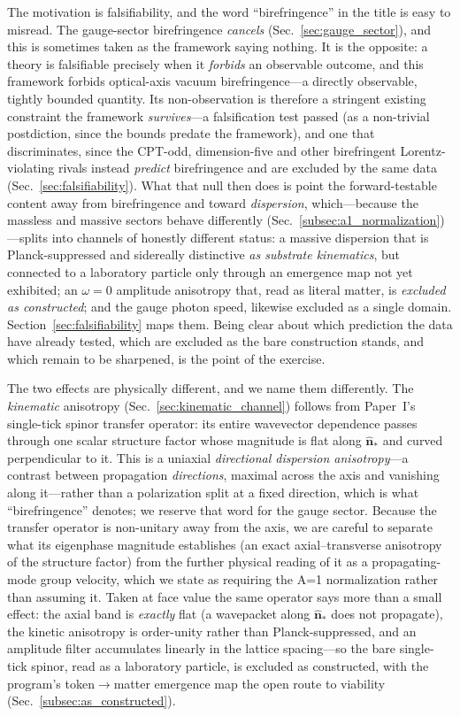 The motivation is falsifiability, and the word ``birefringence'' in the title is
easy to misread. The gauge-sector birefringence \emph{cancels}
(Sec.~\ref{sec:gauge_sector}), and this is sometimes taken as the framework saying
nothing. It is the opposite: a theory is falsifiable precisely when it \emph{forbids}
an observable outcome, and this framework forbids optical-axis vacuum birefringence---a
directly observable, tightly bounded quantity. Its non-observation is therefore a
stringent existing constraint the framework \emph{survives}---a falsification test
passed (as a non-trivial postdiction, since the bounds predate the framework), and one
that discriminates, since the CPT-odd, dimension-five and other birefringent
Lorentz-violating rivals instead \emph{predict} birefringence and are excluded by the
same data (Sec.~\ref{sec:falsifiability}). What that null then
does is point the forward-testable content away from birefringence and toward
\emph{dispersion}, which---because the massless and massive sectors behave
differently (Sec.~\ref{subsec:a1_normalization})---splits into channels of honestly
different status: a massive dispersion that is Planck-suppressed and sidereally
distinctive \emph{as substrate kinematics}, but connected to a laboratory particle only
through an emergence map not yet exhibited; an $\omega=0$ amplitude anisotropy that,
read as literal matter, is \emph{excluded as constructed}; and the gauge photon speed,
likewise excluded as a single domain. Section~\ref{sec:falsifiability} maps them. Being
clear about which prediction the data have already tested, which are excluded as the
bare construction stands, and which remain to be sharpened, is the point of the
exercise.

The two effects are physically different, and we name them differently. The
\emph{kinematic} anisotropy (Sec.~\ref{sec:kinematic_channel}) follows from Paper~I's
single-tick spinor transfer operator: its entire wavevector dependence passes through
one scalar structure factor whose magnitude is flat along $\hat{\mathbf{n}}_*$ and
curved perpendicular to it. This is a uniaxial \emph{directional dispersion
anisotropy}---a contrast between propagation \emph{directions}, maximal across the
axis and vanishing along it---rather than a polarization split at a fixed direction,
which is what ``birefringence'' denotes; we reserve that word for the gauge sector.
Because the transfer operator is non-unitary away from the axis, we are careful to
separate what its eigenphase magnitude establishes (an exact axial--transverse
anisotropy of the structure factor) from the further physical reading of it as a
propagating-mode group velocity, which we state as requiring the A=1 normalization
rather than assuming it. Taken at face value the same operator says more than a small
effect: the axial band is \emph{exactly} flat (a wavepacket along $\hat{\mathbf{n}}_*$
does not propagate), the kinetic anisotropy is order-unity rather than
Planck-suppressed, and an amplitude filter accumulates linearly in the lattice
spacing---so the bare single-tick spinor, read as a laboratory particle, is excluded as
constructed, with the program's token$\to$matter emergence map the open route to
viability (Sec.~\ref{subsec:as_constructed}).

